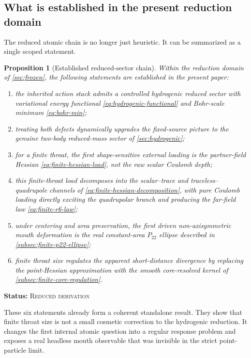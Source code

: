 \documentclass[11pt]{article}
\theoremstyle{plain}
\newtheorem{proposition}[theorem]{Proposition}
\theoremstyle{definition}
\theoremstyle{remark}
\newcommand{\statusReduced}{\textsc{Reduced derivation}}
\newcommand{\claimstatus}[1]{\par\smallskip\noindent\textbf{Status:} #1\par\smallskip}
\newcommand{\Ptwotwo}{P_{22}}
\begin{document}
\subsection{What is established in the present reduction domain}\label{subsec:discussion-established}

The reduced atomic chain is no longer just heuristic. It can be summarized as a single scoped statement.

\begin{proposition}[Established reduced-sector chain]\label{prop:discussion-established-chain}
Within the reduction domain of \cref{sec:frozen}, the following statements are established in the present paper:
\begin{enumerate}
    \item the inherited action stack admits a controlled hydrogenic reduced sector with variational energy functional \cref{eq:hydrogenic-functional} and Bohr-scale minimum \cref{eq:bohr-min};
    \item treating both defects dynamically upgrades the fixed-source picture to the genuine two-body reduced-mass sector of \cref{sec:hydrogenic};
    \item for a finite throat, the first shape-sensitive external loading is the partner-field Hessian \cref{eq:finite-hessian-load}, not the raw scalar Coulomb depth;
    \item this finite-throat load decomposes into the scalar--trace and traceless--quadrupole channels of \cref{eq:finite-hessian-decomposition}, with pure Coulomb loading directly exciting the quadrupolar branch and producing the far-field law \cref{eq:finite-r6-law};
    \item under centering and area preservation, the first driven non-axisymmetric mouth deformation is the real constant-area \(\Ptwotwo\) ellipse described in \cref{subsec:finite-p22-ellipse};
    \item finite throat size regulates the apparent short-distance divergence by replacing the point-Hessian approximation with the smooth core-resolved kernel of \cref{subsec:finite-core-regulation}.
\end{enumerate}
\end{proposition}
\claimstatus{\statusReduced}

These six statements already form a coherent standalone result. They show that finite throat size is not a small cosmetic correction to the hydrogenic reduction. It changes the first internal atomic question into a regular response problem and exposes a real headless mouth observable that was invisible in the strict point-particle limit.
\end{document}
